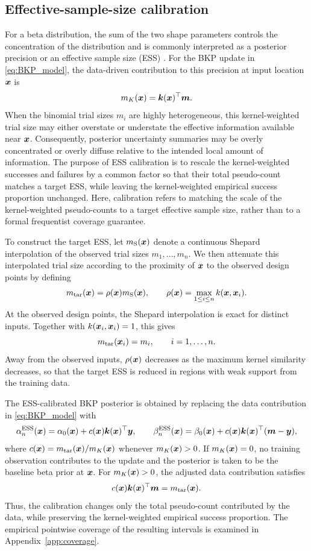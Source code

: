 \documentclass[article, shortnames]{jss}
\renewcommand{\vec}[1]{\mbox{\boldmath ${#1}$}}
\begin{document}
\subsection{Effective-sample-size calibration}\label{sec:ESS}

For a beta distribution, the sum of the two shape parameters controls the concentration of the distribution and is commonly interpreted as a posterior precision or an effective sample size (ESS) \citep{Morita2008ESS}. 
For the BKP update in \eqref{eq:BKP_model}, the data-driven contribution to this precision at input location $\vec{x}$ is
\[
m_K(\vec{x}) = \vec{k}(\vec{x})^\top \vec{m}.
\]
When the binomial trial sizes $m_i$ are highly heterogeneous, this kernel-weighted trial size may either overstate or understate the effective information available near $\vec{x}$. 
Consequently, posterior uncertainty summaries may be overly concentrated or overly diffuse relative to the intended local amount of information.
The purpose of ESS calibration is to rescale the kernel-weighted successes and failures by a common factor so that their total pseudo-count matches a target ESS, while leaving the kernel-weighted empirical success proportion unchanged.
Here, calibration refers to matching the scale of the kernel-weighted pseudo-counts to a target effective sample size, rather than to a formal frequentist coverage guarantee.

To construct the target ESS, let $m_{\mathrm S}(\vec{x})$ denote a continuous Shepard interpolation \citep{Shepard1968} of the observed trial sizes $m_1,\ldots,m_n$. 
We then attenuate this interpolated trial size according to the proximity of $\vec{x}$ to the observed design points by defining
\[
m_{\mathrm{tar}}(\vec{x}) = \rho(\vec{x})m_{\mathrm S}(\vec{x}),
\qquad
\rho(\vec{x}) = \max_{1\le i\le n} k(\vec{x},\vec{x}_i).
\]
At the observed design points, the Shepard interpolation is exact for distinct inputs. Together with $k(\vec{x}_i,\vec{x}_i)=1$, this gives
\[
	m_{\mathrm{tar}}(\vec{x}_i)=m_i,\qquad i =1,\ldots,n.
\]
Away from the observed inputs, $\rho(\vec{x})$ decreases as the maximum kernel similarity decreases, so that the target ESS is reduced in regions with weak support from the training data.

The ESS-calibrated BKP posterior is obtained by replacing the data contribution in \eqref{eq:BKP_model} with
\[
	\alpha_n^{\mathrm{ESS}}(\vec{x}) 
	= \alpha_0(\vec{x}) + c(\vec{x})\vec{k}(\vec{x})^\top\vec{y},
	\qquad
	\beta_n^{\mathrm{ESS}}(\vec{x}) 
	= \beta_0(\vec{x}) + c(\vec{x})\vec{k}(\vec{x})^\top(\vec{m}-\vec{y}),
\]
where $c(\vec{x}) = m_{\mathrm{tar}}(\vec{x})/m_K(\vec{x})$ whenever $m_K(\vec{x})>0$. 
If $m_K(\vec{x})=0$, no training observation contributes to the update and the posterior is taken to be the baseline beta prior at $\vec{x}$. 
For $m_K(\vec{x})>0$, the adjusted data contribution satisfies
\[
	c(\vec{x})\vec{k}(\vec{x})^\top\vec{m}=m_{\mathrm{tar}}(\vec{x}).
\]
Thus, the calibration changes only the total pseudo-count contributed by the data, while preserving the kernel-weighted empirical success proportion.
The empirical pointwise coverage of the resulting intervals is examined in Appendix~\ref{app:coverage}.
\end{document}
